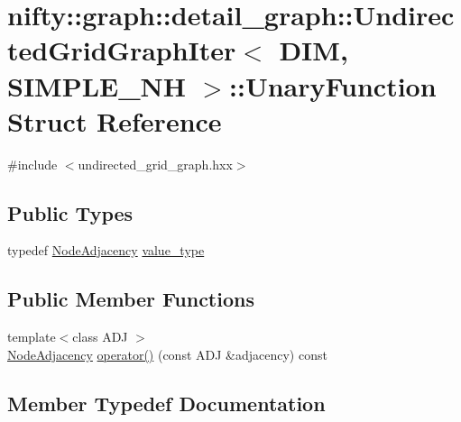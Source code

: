 \hypertarget{structnifty_1_1graph_1_1detail__graph_1_1UndirectedGridGraphIter_1_1UnaryFunction}{}\section{nifty\+:\+:graph\+:\+:detail\+\_\+graph\+:\+:Undirected\+Grid\+Graph\+Iter$<$ D\+IM, S\+I\+M\+P\+L\+E\+\_\+\+NH $>$\+:\+:Unary\+Function Struct Reference}
\label{structnifty_1_1graph_1_1detail__graph_1_1UndirectedGridGraphIter_1_1UnaryFunction}


{\ttfamily \#include $<$undirected\+\_\+grid\+\_\+graph.\+hxx$>$}

\subsection*{Public Types}
\begin{DoxyCompactItemize}
\item 
typedef \hyperlink{classnifty_1_1graph_1_1detail__graph_1_1UndirectedGridGraphIter_ab102d464df39aae71f7482baa37d8966}{Node\+Adjacency} \hyperlink{structnifty_1_1graph_1_1detail__graph_1_1UndirectedGridGraphIter_1_1UnaryFunction_a4a60979fef293486b48029f101ceaf66}{value\+\_\+type}
\end{DoxyCompactItemize}
\subsection*{Public Member Functions}
\begin{DoxyCompactItemize}
\item 
{\footnotesize template$<$class A\+DJ $>$ }\\\hyperlink{classnifty_1_1graph_1_1detail__graph_1_1UndirectedGridGraphIter_ab102d464df39aae71f7482baa37d8966}{Node\+Adjacency} \hyperlink{structnifty_1_1graph_1_1detail__graph_1_1UndirectedGridGraphIter_1_1UnaryFunction_a6e0c8bc7a5f99bca449d7e8337f5bdd6}{operator()} (const A\+DJ \&adjacency) const
\end{DoxyCompactItemize}


\subsection{Member Typedef Documentation}
\mbox{\label{structnifty_1_1graph_1_1detail__graph_1_1UndirectedGridGraphIter_1_1UnaryFunction_a4a60979fef293486b48029f101ceaf66}} 
